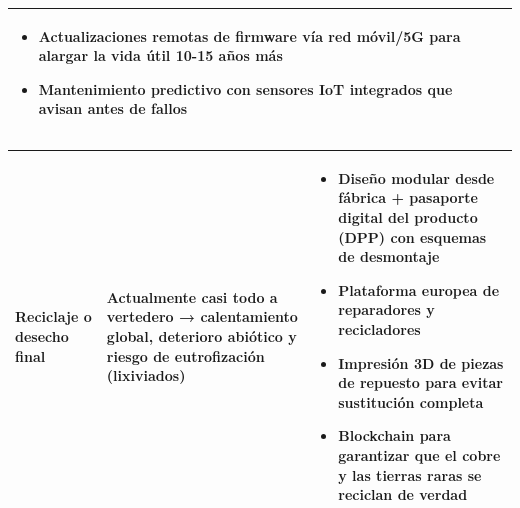 \begin{solution}
\begin{center}
\begin{tabular}{|p{3.2cm}|p{4.5cm}|p{5.5cm}|}
		\begin{itemize}[label=\textbullet, leftmargin=*, nosep]
			\item{Actualizaciones remotas de firmware vía red móvil/5G para alargar la vida útil 10-15 años más}  
			\item{Mantenimiento predictivo con sensores IoT integrados que avisan antes de fallos}
		\end{itemize}

		\\
		\hline
	\end{tabular} 
	\end{center}
	\end{solution}

	\begin{solution}
	\begin{center}

	\begin{tabular}{|p{3.2cm}|p{4.5cm}|p{5.5cm}|}
		\hline
		Reciclaje o desecho final & Actualmente casi todo a vertedero → calentamiento global, deterioro abiótico y riesgo de eutrofización (lixiviados)& 
		\begin{itemize}[label=\textbullet, leftmargin=*, nosep]
			\item{Diseño modular desde fábrica + pasaporte digital del producto (DPP) con esquemas de desmontaje}
			\item{Plataforma europea de reparadores y recicladores}
			\item{Impresión 3D de piezas de repuesto para evitar sustitución completa}
			\item{Blockchain para garantizar que el cobre y las tierras raras se reciclan de verdad}
		\end{itemize}
		\\
		\hline

	\end{tabular}

\end{center}


\end{solution}
